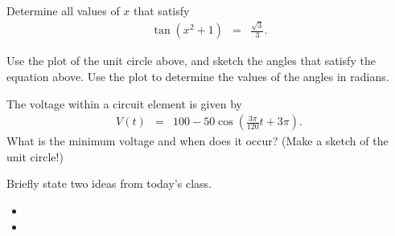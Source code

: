 \begin{problem}
  \vfill

  \clearpage

\item Determine all values of $x$ that satisfy
  \begin{eqnarray*}
    \tan(x^2+1) & = & \frac{\sqrt{3}}{3}.
  \end{eqnarray*}


  Use the plot of the unit circle above, and sketch the angles that
  satisfy the equation above. Use the plot to determine the values of
  the angles in radians.

  \vfill

  \clearpage

\item The voltage within a circuit element is given by
  \begin{eqnarray*}
    V(t) & = & 100-50\cos\left( \frac{3\pi}{120} t + 3\pi \right).
  \end{eqnarray*}
  What is the minimum voltage and when does it occur? (Make a sketch
  of the unit circle!)

  \vfill

\end{problem}

\postClass

\begin{problem}
\item Briefly state two ideas from today's class.
  \begin{itemize}
  \item
  \item
  \end{itemize}
\item
  \begin{subproblem}
    \item
  \end{subproblem}
\end{problem}


